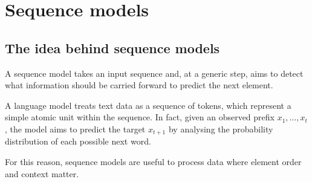 \documentclass{report}
\begin{document}
\chapter{Sequence models}
\section{The idea behind sequence models}
A sequence model takes an input sequence and, at a generic step, aims to detect what information should be carried forward to predict the next element.
\begin{examplebox}
    A language model treats text data as a sequence of tokens, which represent a simple atomic unit within the sequence. \newline
    In fact, given an observed prefix $\displaystyle x_1, \dots, x_t$, the model aims to predict the target $\displaystyle x_{t + 1}$ by analysing the probability distribution of each possible next word.
\end{examplebox}
\noindent For this reason, sequence models are useful to process data where element order and context matter.
\end{document}
